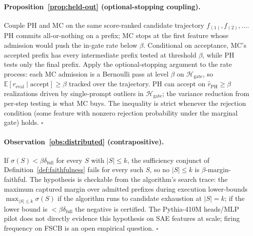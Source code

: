 \documentclass[10pt]{article}
\begin{document}
\paragraph{Proposition~\ref{prop:held-out} (optional-stopping coupling).} Couple PH and MC on the same score-ranked candidate trajectory $f_{(1)}, f_{(2)}, \dots$. PH commits all-or-nothing on a prefix; MC stops at the first feature whose admission would push the in-gate rate below $\beta$. Conditional on acceptance, MC's accepted prefix has every intermediate prefix tested at threshold $\beta$, while PH tests only the final prefix. Apply the optional-stopping argument to the rate process: each MC admission is a Bernoulli pass at level $\beta$ on $\mathcal{H}_{\text{gate}}$, so $\mathbb{E}[r_{\text{eval}} \mid \text{accept}] \geq \beta$ tracked over the trajectory. PH can accept on $\hat r_{\text{PH}} \geq \beta$ realizations driven by single-prompt outliers in $\mathcal{H}_{\text{gate}}$; the variance reduction from per-step testing is what MC buys. The inequality is strict whenever the rejection condition (some feature with nonzero rejection probability under the marginal gate) holds. $\square$

\paragraph{Observation~\ref{obs:distributed} (contrapositive).} If $\sigma(S) < \beta\delta_{\text{full}}$ for every $S$ with $|S| \leq k$, the sufficiency conjunct of Definition~\ref{def:faithfulness} fails for every such $S$, so no $|S| \leq k$ is $\beta$-margin-faithful. The hypothesis is checkable from the algorithm's search trace: the maximum captured margin over admitted prefixes during execution lower-bounds $\max_{|S|\leq k} \sigma(S)$ if the algorithm runs to candidate exhaustion at $|S| = k$; if the lower bound is $< \beta\delta_{\text{full}}$ the negative is certified. The Pythia-410M heads/MLP pilot does not directly evidence this hypothesis on SAE features at scale; firing frequency on FSCB is an open empirical question. $\square$
\end{document}
